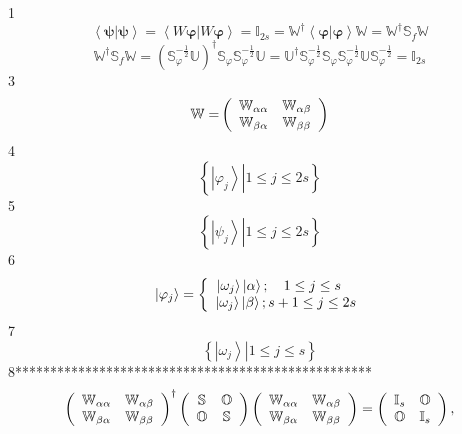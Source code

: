 \documentclass[aps,preprint]{revtex4}%
\begin{document}
1%
\[
\left\langle \left.  \mathbf{\psi}\right\vert \mathbf{\psi}\right\rangle
=\left\langle \left.  W\mathbf{\varphi}\right\vert W\mathbf{\varphi
}\right\rangle =\mathbb{I}_{2s}=\mathbb{W}^{\dagger}\left\langle \left.
\mathbf{\varphi}\right\vert \mathbf{\varphi}\right\rangle \mathbb{W}%
=\mathbb{W}^{\dagger}\mathbb{S}_{f}\mathbb{W}%
\]%
\[
\mathbb{W}^{\dagger}\mathbb{S}_{f}\mathbb{W}=\left(  \mathbb{S}_{\varphi
}^{-\frac{1}{2}}\mathbb{U}\right)  ^{\dagger}\mathbb{S}_{\varphi}%
\mathbb{S}_{\varphi}^{-\frac{1}{2}}\mathbb{U}=\mathbb{U}^{\dagger}%
\mathbb{S}_{\varphi}^{-\frac{1}{2}}\mathbb{S}_{\varphi}\mathbb{S}_{\varphi
}^{-\frac{1}{2}}\mathbb{US}_{\varphi}^{-\frac{1}{2}}=\mathbb{I}_{2s}%
\]
3%
\[
\mathbb{W=}\left(
\begin{array}
[c]{cc}%
\mathbb{W}_{\alpha\alpha} & \mathbb{W}_{\alpha\beta}\\
\mathbb{W}_{\beta\alpha} & \mathbb{W}_{\beta\beta}%
\end{array}
\right)
\]
4%
\[
\left\{  \left.  \left\vert \varphi_{j}\right\rangle \right\vert 1\leq
j\leq2s\right\}
\]
5%
\[
\left\{  \left.  \left\vert \psi_{j}\right\rangle \right\vert 1\leq
j\leq2s\right\}
\]
6%
\[
\left\vert \varphi_{j}\right\rangle =\left\{
\begin{array}
[c]{c}%
\left\vert \omega_{j}\right\rangle \left\vert \alpha\right\rangle ;\quad1\leq
j\leq s\quad\\
\left\vert \omega_{j}\right\rangle \left\vert \beta\right\rangle ;s+1\leq
j\leq2s
\end{array}
\right.
\]
7%
\[
\left\{  \left.  \left\vert \omega_{j}\right\rangle \right\vert 1\leq j\leq
s\right\}
\]
8***************************************************%
\[
\left(
\begin{array}
[c]{cc}%
\mathbb{W}_{\alpha\alpha} & \mathbb{W}_{\alpha\beta}\\
\mathbb{W}_{\beta\alpha} & \mathbb{W}_{\beta\beta}%
\end{array}
\right)  ^{\dagger}\left(
\begin{array}
[c]{cc}%
\mathbb{S} & \mathbb{O}\\
\mathbb{O} & \mathbb{S}%
\end{array}
\right)  \left(
\begin{array}
[c]{cc}%
\mathbb{W}_{\alpha\alpha} & \mathbb{W}_{\alpha\beta}\\
\mathbb{W}_{\beta\alpha} & \mathbb{W}_{\beta\beta}%
\end{array}
\right)  =\left(
\begin{array}
[c]{cc}%
\mathbb{I}_{s} & \mathbb{O}\\
\mathbb{O} & \mathbb{I}_{s}%
\end{array}
\right)  ,
\]
\end{document}
